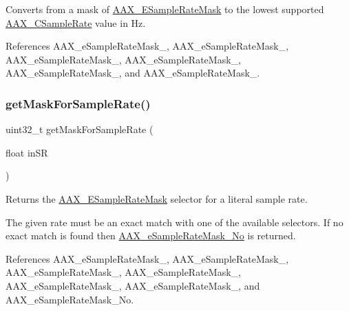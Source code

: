 Converts from a mask of \mbox{\hyperlink{a00491_a5bb98259de21d2c4d04a2d6010d757c7}{A\+A\+X\+\_\+\+E\+Sample\+Rate\+Mask}} to the lowest supported \mbox{\hyperlink{a00392_a3d9eea08f47e0b0a23432e15baa4e885}{A\+A\+X\+\_\+\+C\+Sample\+Rate}} value in Hz. 



References A\+A\+X\+\_\+e\+Sample\+Rate\+Mask\+\_, A\+A\+X\+\_\+e\+Sample\+Rate\+Mask\+\_, A\+A\+X\+\_\+e\+Sample\+Rate\+Mask\+\_, A\+A\+X\+\_\+e\+Sample\+Rate\+Mask\+\_, A\+A\+X\+\_\+e\+Sample\+Rate\+Mask\+\_, and A\+A\+X\+\_\+e\+Sample\+Rate\+Mask\+\_.

\mbox{\label{a00392_a35608eb248567091abba77878fb87eab}} 
\subsubsection{\texorpdfstring{getMaskForSampleRate()}{getMaskForSampleRate()}}
{\footnotesize\ttfamily uint32\+\_\+t get\+Mask\+For\+Sample\+Rate (\begin{DoxyParamCaption}\item[{float}]{in\+SR }\end{DoxyParamCaption})\hspace{0.3cm}{\ttfamily [inline]}}



Returns the \mbox{\hyperlink{a00491_a5bb98259de21d2c4d04a2d6010d757c7}{A\+A\+X\+\_\+\+E\+Sample\+Rate\+Mask}} selector for a literal sample rate. 

The given rate must be an exact match with one of the available selectors. If no exact match is found then \mbox{\hyperlink{a00491_a5bb98259de21d2c4d04a2d6010d757c7a458fc436e77f902b77b7b983a851219f}{A\+A\+X\+\_\+e\+Sample\+Rate\+Mask\+\_\+\+No}} is returned. 

References A\+A\+X\+\_\+e\+Sample\+Rate\+Mask\+\_, A\+A\+X\+\_\+e\+Sample\+Rate\+Mask\+\_, A\+A\+X\+\_\+e\+Sample\+Rate\+Mask\+\_, A\+A\+X\+\_\+e\+Sample\+Rate\+Mask\+\_, A\+A\+X\+\_\+e\+Sample\+Rate\+Mask\+\_, A\+A\+X\+\_\+e\+Sample\+Rate\+Mask\+\_, and A\+A\+X\+\_\+e\+Sample\+Rate\+Mask\+\_\+\+No.

